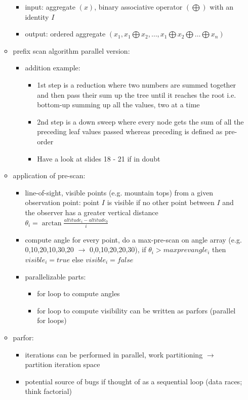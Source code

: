 \documentclass[a4paper]{article}
\begin{document}
\begin{itemize}
\begin{itemize}
\begin{itemize}
\item input: aggregate $(x)$, binary associative operator $(\bigoplus)$ with an identity $I$
\item output: ordered aggregate $(x_1,x_1 \bigoplus x_2,\dots ,x_1 \bigoplus x_2\bigoplus\dots\bigoplus x_n)$
\end{itemize}
\item prefix  scan algorithm parallel version: 
\begin{itemize}
\item addition example: 
\begin{itemize}
\item 1st step is a reduction where two numbers are summed together and then pass their sum up the tree until it reaches the root i.e. bottom-up summing up all the values, two at a time
\item 2nd step is a down sweep where every node gets the sum of all the preceding leaf values passed whereas preceding is defined as pre-order 
\item Have a look at slides 18 - 21 if in doubt
\end{itemize}
\end{itemize}
\item application of pre-scan: 
\begin{itemize}
\item line-of-sight, visible points (e.g. mountain tops) from a given observation point: point $I$ is visible if no other point between $I$ and the observer has a greater vertical distance 
$\theta_i=\arctan\frac{altitude_i-altitude_0}{i}$
\item compute angle for every point, do a max-pre-scan on angle array (e.g. 0,10,20,10,30,20 $\rightarrow$ 0,0,10,20,20,30), if $\theta_i>maxprevangle_i$ then $visible_i  = true$ else $visible_i  =false$
\item parallelizable parts: 
\begin{itemize}
\item for loop to compute angles
\item for loop to compute visibility can be written as parfors (parallel for loops)
\end{itemize}
\end{itemize}
\item parfor: 
\begin{itemize}
\item iterations can be performed in parallel, work partitioning $\rightarrow$ partition iteration space
\item potential source of bugs if thought of as a sequential loop (data races; think factorial)
\end{itemize}
\end{itemize}
\end{itemize}
\end{document}
